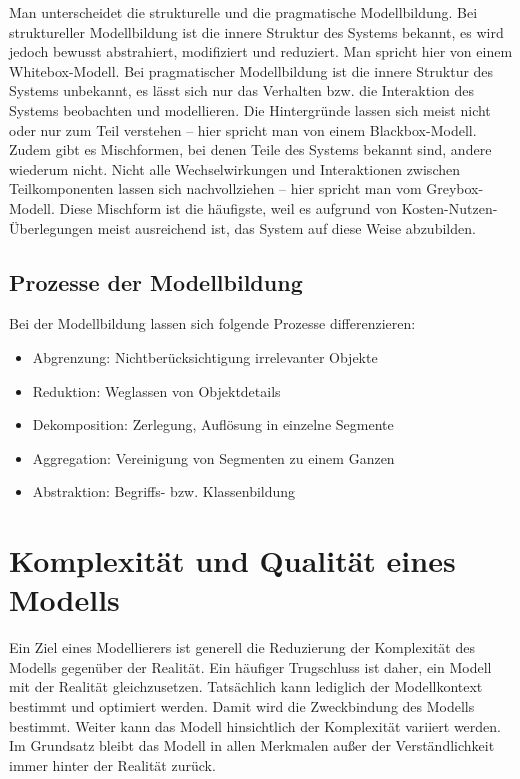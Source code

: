 \documentclass[a4paper, 12pt]{scrartcl}
\begin{document}
Man unterscheidet die strukturelle und die pragmatische Modellbildung. Bei struktureller Modellbildung ist die innere Struktur des Systems bekannt, es wird jedoch bewusst abstrahiert, modifiziert und reduziert. Man spricht hier von einem Whitebox-Modell. Bei pragmatischer Modellbildung ist die innere Struktur des Systems unbekannt, es lässt sich nur das Verhalten bzw. die Interaktion des Systems beobachten und modellieren. Die Hintergründe lassen sich meist nicht oder nur zum Teil verstehen – hier spricht man von einem Blackbox-Modell. Zudem gibt es Mischformen, bei denen Teile des Systems bekannt sind, andere wiederum nicht. Nicht alle Wechselwirkungen und Interaktionen zwischen Teilkomponenten lassen sich nachvollziehen – hier spricht man vom Greybox-Modell. Diese Mischform ist die häufigste, weil es aufgrund von Kosten-Nutzen-Überlegungen meist ausreichend ist, das System auf diese Weise abzubilden.

\subsection{Prozesse der Modellbildung}

Bei der Modellbildung lassen sich folgende Prozesse differenzieren:

\begin{itemize}
    \item Abgrenzung: Nichtberücksichtigung irrelevanter Objekte
    \item Reduktion: Weglassen von Objektdetails
    \item Dekomposition: Zerlegung, Auflösung in einzelne Segmente
    \item Aggregation: Vereinigung von Segmenten zu einem Ganzen
    \item Abstraktion: Begriffs- bzw. Klassenbildung
\end{itemize}

\section{Komplexität und Qualität eines Modells}

Ein Ziel eines Modellierers ist generell die Reduzierung der Komplexität des Modells gegenüber der Realität. Ein häufiger Trugschluss ist daher, ein Modell mit der Realität gleichzusetzen. Tatsächlich kann lediglich der Modellkontext bestimmt und optimiert werden. Damit wird die Zweckbindung des Modells bestimmt. Weiter kann das Modell hinsichtlich der Komplexität variiert werden. Im Grundsatz bleibt das Modell in allen Merkmalen außer der Verständlichkeit immer hinter der Realität zurück.
\end{document}
